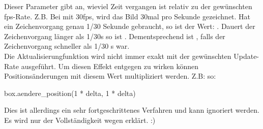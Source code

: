 \documentclass{\VorlagenPfad/coderdojokatext}
\begin{document}
Dieser Parameter gibt an, wieviel Zeit vergangen ist relativ zu der gewünschten fps-Rate. Z.B. Bei mit 30fps, wird das Bild 30mal pro Sekunde gezeichnet. Hat ein Zeichenvorgang genau 1/30 Sekunde gebraucht, so ist der Wert: . Dauert der Zeichenvorgang länger als 1/30s so ist . Dementsprechend ist , falls der Zeichenvorgang schneller als 1/30 s war.
\\ Die Aktualisierungfunktion wird nicht immer exakt mit der gewünschten Update-Rate ausgeführt. Um diesen Effekt entgegen zu wirken können Positionsänderungen mit diesem Wert multipliziert werden. Z.B: so:
\begin{pythoncode}
	box.aendere_position(1 * delta, 1 * delta)	
	\end{pythoncode}
	Dies ist allerdings ein sehr fortgeschrittenes Verfahren und kann ignoriert werden. Es wird nur der Vollständigkeit wegen erklärt. :)
\end{document}

